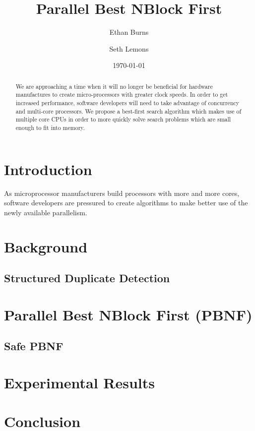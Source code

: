 \documentclass{article}
\title{Parallel Best NBlock First}
\author{Ethan Burns \and Seth Lemons}
\date{\today}
\begin{document}
\maketitle

\begin{abstract}
We are approaching a time when it will no longer be beneficial for
hardware manufactures to create micro-processors with greater clock
speeds.  In order to get increased performance, software developers
will need to take advantage of concurrency and multi-core processors.
We propose a best-first search algorithm which makes use of multiple
core CPUs in order to more quickly solve search problems which are
small enough to fit into memory.
\end{abstract}

\section{Introduction}

As microprocessor manufacturers build processors with more and more
cores, software developers are pressured to create algorithms to make
better use of the newly available parallelism.

\section{Background}
\subsection{Structured Duplicate Detection}
\section{Parallel Best NBlock First (PBNF)}
\subsection{Safe PBNF}
\section{Experimental Results}
\section{Conclusion}



\end{document}
